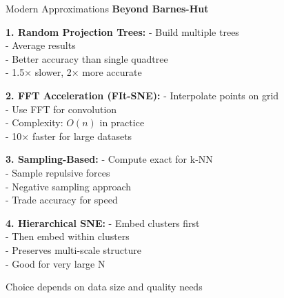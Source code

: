 \documentclass[10pt]{beamer}
\newcommand{\emphtext}[1]{\textcolor{upcblue}{\textbf{#1}}}
\newcommand{\conceptbox}[1]{\colorbox{upcblue!10}{\begin{minipage}{0.85\textwidth}\centering #1\end{minipage}}}
\begin{document}
\begin{frame}{Modern Approximations}
\emphtext{Beyond Barnes-Hut}

\vspace{0.3cm}
\textbf{1. Random Projection Trees:}
\footnotesize
- Build multiple trees\\
- Average results\\
- Better accuracy than single quadtree\\
- 1.5× slower, 2× more accurate

\vspace{0.2cm}
\textbf{2. FFT Acceleration (FIt-SNE):}
\footnotesize
- Interpolate points on grid\\
- Use FFT for convolution\\
- Complexity: $O(n)$ in practice\\
- 10× faster for large datasets

\vspace{0.2cm}
\textbf{3. Sampling-Based:}
\footnotesize
- Compute exact for k-NN\\
- Sample repulsive forces\\
- Negative sampling approach\\
- Trade accuracy for speed

\vspace{0.2cm}
\textbf{4. Hierarchical SNE:}
\footnotesize
- Embed clusters first\\
- Then embed within clusters\\
- Preserves multi-scale structure\\
- Good for very large N

\begin{center}
\conceptbox{\footnotesize Choice depends on data size and quality needs}
\end{center}
\end{frame}
\end{document}
